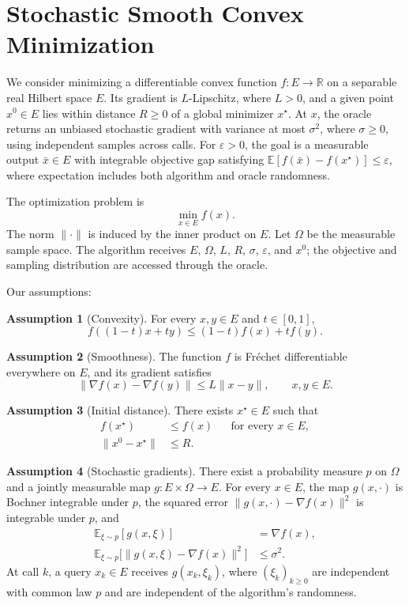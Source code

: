 \documentclass[10pt]{article}
\theoremstyle{definition}
\newtheorem{assumption}{Assumption}
\begin{document}
\section*{Stochastic Smooth Convex Minimization}
We consider minimizing a differentiable convex function $f:E\to\mathbb{R}$ on a separable real Hilbert space $E$. Its gradient is $L$-Lipschitz, where $L>0$, and a given point $x^0\in E$ lies within distance $R\geq0$ of a global minimizer $x^\star$. At $x$, the oracle returns an unbiased stochastic gradient with variance at most $\sigma^2$, where $\sigma\geq0$, using independent samples across calls. For $\varepsilon>0$, the goal is a measurable output $\bar{x}\in E$ with integrable objective gap satisfying $\mathbb{E}[f(\bar{x})-f(x^\star)]\leq\varepsilon$, where expectation includes both algorithm and oracle randomness.

The optimization problem is
\[
\min_{x\in E} f(x).
\]
The norm $\|\cdot\|$ is induced by the inner product on $E$. Let $\Omega$ be the measurable sample space. The algorithm receives $E$, $\Omega$, $L$, $R$, $\sigma$, $\varepsilon$, and $x^0$; the objective and sampling distribution are accessed through the oracle.

Our assumptions:
\begin{assumption}[Convexity]
For every $x,y\in E$ and $t\in[0,1]$,
\[
f((1-t)x+ty)\leq(1-t)f(x)+t f(y).
\]
\end{assumption}

\begin{assumption}[Smoothness]
The function $f$ is Fr\'echet differentiable everywhere on $E$, and its gradient satisfies
\[
\|\nabla f(x)-\nabla f(y)\|\leq L\|x-y\|,
\qquad x,y\in E.
\]
\end{assumption}

\begin{assumption}[Initial distance]
There exists $x^\star\in E$ such that
\[
\begin{aligned}
f(x^\star)&\leq f(x) &&\text{for every }x\in E,\\
\|x^0-x^\star\|&\leq R.
\end{aligned}
\]
\end{assumption}

\begin{assumption}[Stochastic gradients]
There exist a probability measure $p$ on $\Omega$ and a jointly measurable map $g:E\times\Omega\to E$. For every $x\in E$, the map $g(x,\cdot)$ is Bochner integrable under $p$, the squared error $\|g(x,\cdot)-\nabla f(x)\|^2$ is integrable under $p$, and
\[
\begin{aligned}
\mathbb{E}_{\xi\sim p}[g(x,\xi)]&=\nabla f(x),\\
\mathbb{E}_{\xi\sim p}\bigl[\|g(x,\xi)-\nabla f(x)\|^2\bigr]&\leq\sigma^2.
\end{aligned}
\]
At call $k$, a query $x_k\in E$ receives $g(x_k,\xi_k)$, where $(\xi_k)_{k\geq0}$ are independent with common law $p$ and are independent of the algorithm's randomness.
\end{assumption}
\end{document}
